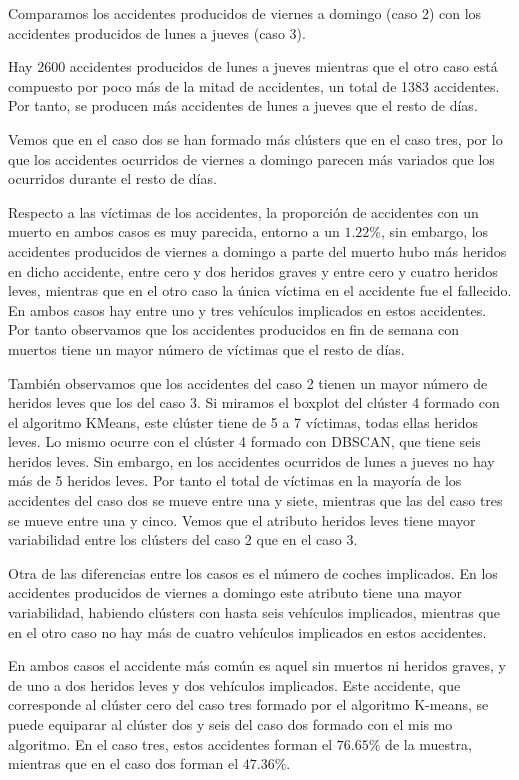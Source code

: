 \documentclass[a4]{article}
\begin{document}
Comparamos los accidentes producidos de viernes a domingo (caso 2) con los accidentes producidos de lunes a jueves (caso 3).

Hay 2600 accidentes producidos de lunes a jueves mientras que el otro caso está compuesto por poco más de la mitad de accidentes, un total de 1383 accidentes. Por tanto, se producen más accidentes de lunes a jueves que el resto de días.

Vemos que en el caso dos se han formado más clústers que en el caso tres, por lo que los accidentes ocurridos de viernes a domingo parecen más variados que los ocurridos durante el resto de días.

Respecto a las víctimas de los accidentes, la proporción de accidentes con un muerto en ambos casos es muy parecida, entorno a un $1.22\%$, sin embargo, los accidentes producidos de viernes a domingo a parte del muerto hubo más heridos en dicho accidente, entre cero y dos heridos graves y entre cero y cuatro heridos leves, mientras que en el otro caso la única víctima en el accidente fue el fallecido. En ambos casos hay entre uno y tres vehículos implicados en estos accidentes. Por tanto observamos que los accidentes producidos en fin de semana con muertos tiene un mayor número de víctimas que el resto de días.

También observamos que los accidentes del caso 2 tienen un mayor número de heridos leves que los del caso 3. Si miramos el boxplot del clúster 4 formado con el algoritmo KMeans, este clúster tiene de 5 a 7 víctimas, todas ellas heridos leves. Lo mismo ocurre con el clúster 4 formado con DBSCAN, que tiene seis heridos leves. Sin embargo, en los accidentes ocurridos de lunes a jueves no hay más de 5 heridos leves. Por tanto el total de víctimas en la mayoría de los accidentes del caso dos se mueve entre una y siete, mientras que las del caso tres se mueve entre una y cinco. Vemos que el atributo heridos leves tiene mayor variabilidad entre los clústers del caso 2 que en el caso 3.

Otra de las diferencias entre los casos es el número de coches implicados. En los accidentes producidos de viernes a domingo este atributo tiene una mayor variabilidad, habiendo clústers con hasta seis vehículos implicados, mientras que en el otro caso no hay más de cuatro vehículos implicados en estos accidentes.

En ambos casos el accidente más común es aquel sin muertos ni heridos graves, y de uno a dos heridos leves y dos vehículos implicados. Este accidente, que corresponde al clúster cero del caso tres formado por el algoritmo K-means, se puede equiparar al clúster dos y seis del caso dos formado con el mis mo algoritmo. En el caso tres, estos accidentes forman el $76.65\%$ de la muestra, mientras que en el caso dos forman el $47.36\%$. 
\end{document}
